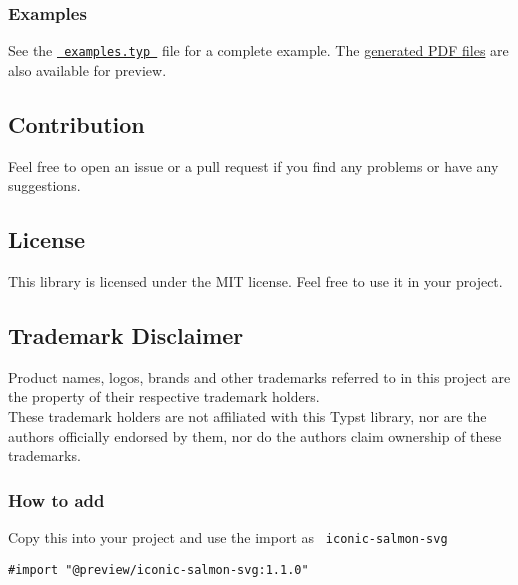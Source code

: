 \subsubsection{Examples}\label{examples}

See the
\href{https://github.com/typst/packages/raw/main/packages/preview/iconic-salmon-svg/1.1.0/examples/examples.typ}{\texttt{\ examples.typ\ }}
file for a complete example. The
\href{https://github.com/typst/packages/raw/main/packages/preview/iconic-salmon-svg/1.1.0/examples/}{generated
PDF files} are also available for preview.

\subsection{Contribution}\label{contribution}

Feel free to open an issue or a pull request if you find any problems or
have any suggestions.

\subsection{License}\label{license}

This library is licensed under the MIT license. Feel free to use it in
your project.

\subsection{Trademark Disclaimer}\label{trademark-disclaimer}

Product names, logos, brands and other trademarks referred to in this
project are the property of their respective trademark holders.\\
These trademark holders are not affiliated with this Typst library, nor
are the authors officially endorsed by them, nor do the authors claim
ownership of these trademarks.

\subsubsection{How to add}\label{how-to-add}

Copy this into your project and use the import as
\texttt{\ iconic-salmon-svg\ }

\begin{verbatim}
#import "@preview/iconic-salmon-svg:1.1.0"
\end{verbatim}




